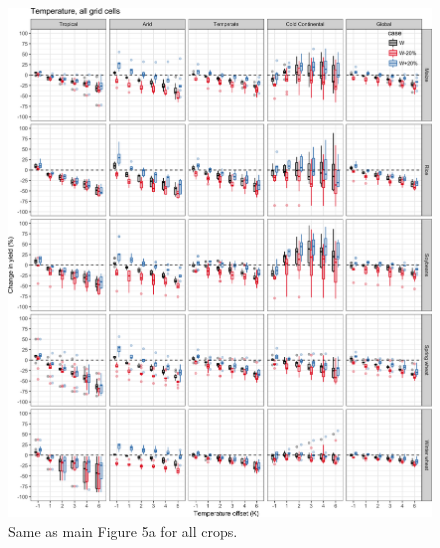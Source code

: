 \documentclass[10pt]{article}
\begin{document}
\begin{figure}[h!]
    \centering
    \includegraphics[width=\textwidth]{s_sim_CG_T.png}
    \caption{Same as main Figure 5a for all crops.}
    \label{fig:temperautre}
\end{figure}
\end{document}
